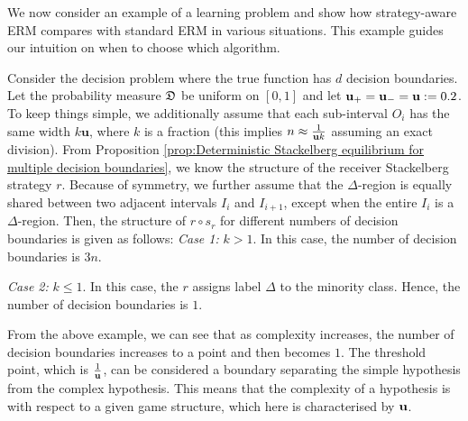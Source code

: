 We now consider an example of a learning problem and show how strategy-aware ERM compares with standard ERM in various situations. This example guides our intuition on when to choose which algorithm.

\begin{exg}\label{eg:Multiple decision boundaries}
    Consider the decision problem where the true function has $d$ decision boundaries. Let the probability measure $\mathfrak{D}$ be uniform on $[0,1]$ and let $\mathbf{u_+} = \mathbf{u_-} = \mathbf{u} := 0.2$. To keep things simple, we additionally assume that each sub-interval $O_i$ has the same width $k\mathbf{u}$, where $k$ is a fraction (this implies $n \approx \frac{1}{\mathbf{u} k}$ assuming an exact division). From Proposition \ref{prop:Deterministic Stackelberg equilibrium for multiple decision boundaries}, we know the structure of the receiver Stackelberg strategy $r$. Because of symmetry, we further assume that the $\Delta$-region is equally shared between two adjacent intervals $I_i$ and $I_{i+1}$, except when the entire $I_i$ is a $\Delta$-region. Then, the structure of $r \circ s_r$ for different numbers of decision boundaries is given as follows:
    \noindent \textit{Case 1: } $k > 1$. In this case, the number of decision boundaries is $3n$.

    \noindent \textit{Case 2: } $k \leq 1$. In this case, the $r$ assigns label $\Delta$ to the minority class. Hence, the number of decision boundaries is $1$.
	
\end{exg}



From the above example, we can see that as complexity increases, the number of decision boundaries increases to a point and then becomes $1$. The threshold point, which is $\frac{1}{\mathbf{u}}$, can be considered a boundary separating the simple hypothesis from the complex hypothesis. This means that the complexity of a hypothesis is with respect to a given game structure, which here is characterised by $\mathbf{u}$.

